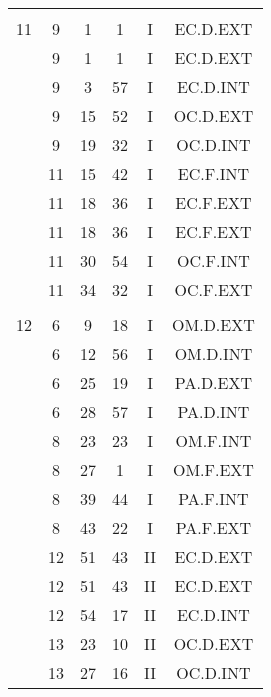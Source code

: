 \documentclass[12pt, a4paper]{article}
\begin{document}
\begin{multicols}{3}
{\begin{tabular}{c c c c c c}
	 	 	 	 & & & & & \\%
	 	 	 	11 & 9 & 1 & 1 & I & EC.D.EXT\\%
	 	 	 	 & 9 & 1 & 1 & I & EC.D.EXT\\%
	 	 	 	 & 9 & 3 & 57 & I & EC.D.INT\\%
	 	 	 	 & 9 & 15 & 52 & I & OC.D.EXT\\%
	 	 	 	 & 9 & 19 & 32 & I & OC.D.INT\\%
	 	 	 	 & 11 & 15 & 42 & I & EC.F.INT\\%
	 	 	 	 & 11 & 18 & 36 & I & EC.F.EXT\\%
	 	 	 	 & 11 & 18 & 36 & I & EC.F.EXT\\%
	 	 	 	 & 11 & 30 & 54 & I & OC.F.INT\\%
	 	 	 	 & 11 & 34 & 32 & I & OC.F.EXT\\%
	 	 	 	 & & & & & \\%
	 	 	 	12 & 6 & 9 & 18 & I & OM.D.EXT\\%
	 	 	 	 & 6 & 12 & 56 & I & OM.D.INT\\%
	 	 	 	 & 6 & 25 & 19 & I & PA.D.EXT\\%
	 	 	 	 & 6 & 28 & 57 & I & PA.D.INT\\%
	 	 	 	 & 8 & 23 & 23 & I & OM.F.INT\\%
	 	 	 	 & 8 & 27 & 1 & I & OM.F.EXT\\%
	 	 	 	 & 8 & 39 & 44 & I & PA.F.INT\\%
	 	 	 	 & 8 & 43 & 22 & I & PA.F.EXT\\%
	 	 	 	 & 12 & 51 & 43 & II & EC.D.EXT\\%
	 	 	 	 & 12 & 51 & 43 & II & EC.D.EXT\\%
	 	 	 	 & 12 & 54 & 17 & II & EC.D.INT\\%
	 	 	 	 & 13 & 23 & 10 & II & OC.D.EXT\\%
	 	 	 	 & 13 & 27 & 16 & II & OC.D.INT\\%
	 	 \end{tabular}
 	}
\end{multicols}
\end{document}
